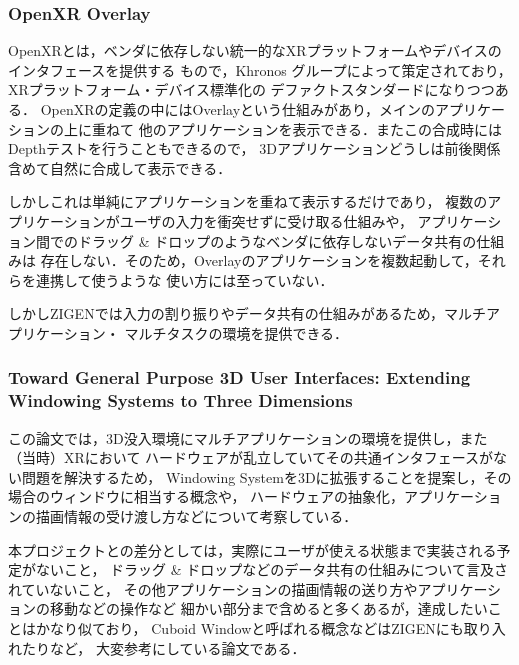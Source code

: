 \subsubsection{OpenXR Overlay}
\label{section:openxr-overlay}

OpenXRとは，ベンダに依存しない統一的なXRプラットフォームやデバイスのインタフェースを提供する
もので，Khronos グループによって策定されており，XRプラットフォーム・デバイス標準化の
デファクトスタンダードになりつつある．
OpenXRの定義の中にはOverlayという仕組みがあり，メインのアプリケーションの上に重ねて
他のアプリケーションを表示できる．またこの合成時にはDepthテストを行うこともできるので，
3Dアプリケーションどうしは前後関係含めて自然に合成して表示できる．

しかしこれは単純にアプリケーションを重ねて表示するだけであり，
複数のアプリケーションがユーザの入力を衝突せずに受け取る仕組みや，
アプリケーション間でのドラッグ \& ドロップのようなベンダに依存しないデータ共有の仕組みは
存在しない．そのため，Overlayのアプリケーションを複数起動して，それらを連携して使うような
使い方には至っていない．

しかしZIGENでは入力の割り振りやデータ共有の仕組みがあるため，マルチアプリケーション・
マルチタスクの環境を提供できる．

\subsubsection{
  Toward General Purpose 3D User Interfaces:
  Extending Windowing Systems to Three Dimensions \cite{forrest}
}

この論文では，3D没入環境にマルチアプリケーションの環境を提供し，また（当時）XRにおいて
ハードウェアが乱立していてその共通インタフェースがない問題を解決するため，
Windowing Systemを3Dに拡張することを提案し，その場合のウィンドウに相当する概念や，
ハードウェアの抽象化，アプリケーションの描画情報の受け渡し方などについて考察している．

本プロジェクトとの差分としては，実際にユーザが使える状態まで実装される予定がないこと，
ドラッグ \& ドロップなどのデータ共有の仕組みについて言及されていないこと，
その他アプリケーションの描画情報の送り方やアプリケーションの移動などの操作など
細かい部分まで含めると多くあるが，達成したいことはかなり似ており，
Cuboid Windowと呼ばれる概念などはZIGENにも取り入れたりなど，
大変参考にしている論文である．

